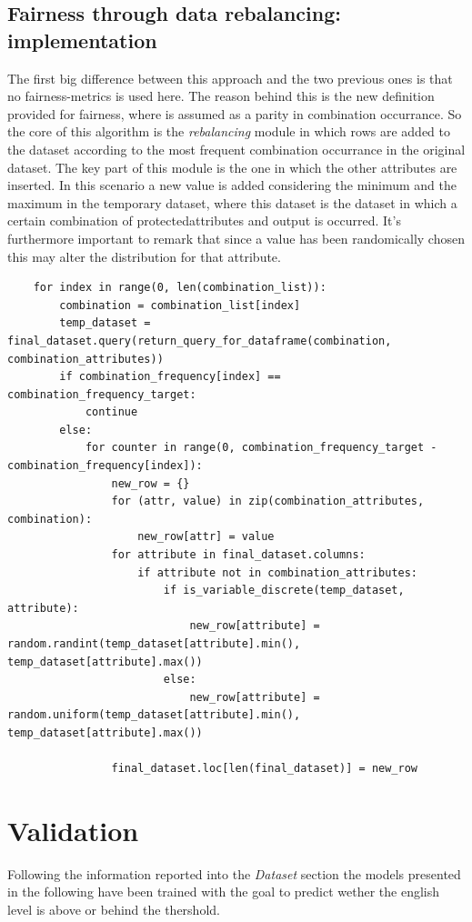 \documentclass[12pt,a4paper,openright,twoside]{book}
\begin{document}
\section{Fairness through data rebalancing: implementation}
The first big difference between this approach and the two previous ones is that no fairness-metrics is used here. The reason behind this is the new definition provided for fairness, where is assumed as a parity in combination occurrance. So the core of this algorithm is the \emph{rebalancing} module in which rows are added to the dataset according to the most frequent combination occurrance in the original dataset.
The key part of this module is the one in which the other attributes are inserted. In this scenario a new value is added considering the minimum and the maximum in the temporary dataset, where this dataset is the dataset in which a certain combination of protected\textunderscore attributes and output is occurred. It's furthermore important to remark that since a value has been  randomically chosen this may alter the distribution for that attribute.
\begin{lstlisting}
    for index in range(0, len(combination_list)):
        combination = combination_list[index]
        temp_dataset = final_dataset.query(return_query_for_dataframe(combination, combination_attributes))
        if combination_frequency[index] == combination_frequency_target:
            continue
        else:
            for counter in range(0, combination_frequency_target - combination_frequency[index]):
                new_row = {}
                for (attr, value) in zip(combination_attributes, combination):
                    new_row[attr] = value
                for attribute in final_dataset.columns:
                    if attribute not in combination_attributes:
                        if is_variable_discrete(temp_dataset, attribute):
                            new_row[attribute] = random.randint(temp_dataset[attribute].min(), temp_dataset[attribute].max())
                        else:
                            new_row[attribute] = random.uniform(temp_dataset[attribute].min(), temp_dataset[attribute].max())
                
                final_dataset.loc[len(final_dataset)] = new_row

\end{lstlisting}

\chapter{Validation} %
\label{chap:validation}
Following the information reported into the \emph{Dataset} section the models presented in the following have been trained with the goal to predict wether the english level is above or behind the thershold. 
\end{document}
